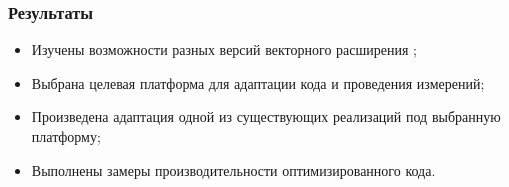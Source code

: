 \documentclass[aspectratio=169]{beamer}
\begin{document}
\begin{frame}
	\frametitle{Результаты}
	\begin{itemize}
		\item Изучены возможности разных версий векторного расширения \riscv{};
		\item Выбрана целевая платформа для адаптации кода и проведения измерений;
		\item Произведена адаптация одной из существующих реализаций под выбранную платформу;
		\item Выполнены замеры производительности оптимизированного кода.
	\end{itemize}
\end{frame}
\end{document}
